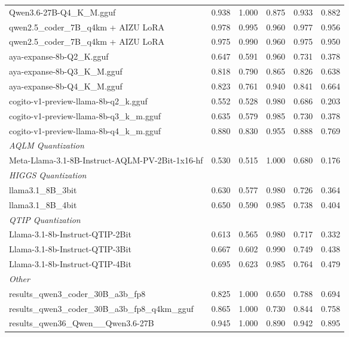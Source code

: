 \begin{table}[htbp]
{\begin{tabular}{lrrrrr}
    Qwen3.6-27B-Q4\_K\_M.gguf & 0.938 & 1.000 & 0.875 & 0.933 & 0.882 \\
    qwen2.5\_coder\_7B\_q4km + AIZU LoRA & 0.978 & 0.995 & 0.960 & 0.977 & \cellcolor{green!40}0.956 \\
    qwen2.5\_coder\_7B\_q4km + AIZU LoRA & 0.975 & 0.990 & 0.960 & 0.975 & \cellcolor{green!10}0.950 \\
    aya-expanse-8b-Q2\_K.gguf & 0.647 & 0.591 & 0.960 & 0.731 & 0.378 \\
    aya-expanse-8b-Q3\_K\_M.gguf & 0.818 & 0.790 & 0.865 & 0.826 & 0.638 \\
    aya-expanse-8b-Q4\_K\_M.gguf & 0.823 & 0.761 & 0.940 & 0.841 & 0.664 \\
    cogito-v1-preview-llama-8b-q2\_k.gguf & 0.552 & 0.528 & 0.980 & 0.686 & 0.203 \\
    cogito-v1-preview-llama-8b-q3\_k\_m.gguf & 0.635 & 0.579 & 0.985 & 0.730 & 0.378 \\
    cogito-v1-preview-llama-8b-q4\_k\_m.gguf & 0.880 & 0.830 & 0.955 & 0.888 & 0.769 \\
    \midrule
    \multicolumn{6}{l}{\textit{AQLM Quantization}} \\
    \midrule
    Meta-Llama-3.1-8B-Instruct-AQLM-PV-2Bit-1x16-hf & 0.530 & 0.515 & 1.000 & 0.680 & 0.176 \\
    \midrule
    \multicolumn{6}{l}{\textit{HIGGS Quantization}} \\
    \midrule
    llama3.1\_8B\_3bit & 0.630 & 0.577 & 0.980 & 0.726 & 0.364 \\
    llama3.1\_8B\_4bit & 0.650 & 0.590 & 0.985 & 0.738 & 0.404 \\
    \midrule
    \multicolumn{6}{l}{\textit{QTIP Quantization}} \\
    \midrule
    Llama-3.1-8b-Instruct-QTIP-2Bit & 0.613 & 0.565 & 0.980 & 0.717 & 0.332 \\
    Llama-3.1-8b-Instruct-QTIP-3Bit & 0.667 & 0.602 & 0.990 & 0.749 & 0.438 \\
    Llama-3.1-8b-Instruct-QTIP-4Bit & 0.695 & 0.623 & 0.985 & 0.764 & 0.479 \\
    \midrule
    \multicolumn{6}{l}{\textit{Other}} \\
    \midrule
    results\_qwen3\_coder\_30B\_a3b\_fp8 & 0.825 & 1.000 & 0.650 & 0.788 & 0.694 \\
    results\_qwen3\_coder\_30B\_a3b\_fp8\_q4km\_gguf & 0.865 & 1.000 & 0.730 & 0.844 & 0.758 \\
    results\_qwen36\_Qwen\_\_Qwen3.6-27B & 0.945 & 1.000 & 0.890 & 0.942 & 0.895 \\
    \bottomrule
  \end{tabular}
  }
\end{table}

